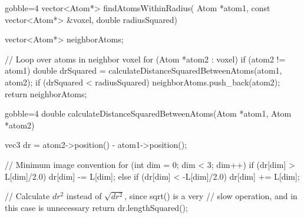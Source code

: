 \begin{listing}[!htb]%
\begin{cppcode*}{gobble=4}
    vector<Atom*> findAtomsWithinRadius(
        Atom *atom1, const vector<Atom*> &voxel, double radiusSquared)
    {
        vector<Atom*> neighborAtoms;
        
        // Loop over atoms in neighbor voxel
        for (Atom *atom2 : voxel)
        {
            if (atom2 != atom1)
            {
                double drSquared = 
                    calculateDistanceSquaredBetweenAtoms(atom1, atom2);
                if (drSquared < radiusSquared)
                {
                    neighborAtoms.push_back(atom2);
                }
            }
        }
        return neighborAtoms;
    }
\end{cppcode*}
\caption{Test%
    \texttt{findAtomsWithinRadius}. See \cref{list:calculateDistanceSquaredBetweenAtoms} for an example implementation of \texttt{calculateDistanceSquaredBetweenAtoms}.%
    \label{list:findAtomsWithinRadius}%
}%
\end{listing}%

\begin{listing}[!htb]%
\begin{cppcode*}{gobble=4}
    double calculateDistanceSquaredBetweenAtoms(Atom *atom1, Atom *atom2)
    {
        vec3 dr = atom2->position() - atom1->position();
        
        // Minimum image convention
        for (int dim = 0; dim < 3; dim++)
        {
            if      (dr[dim] >  L[dim]/2.0) dr[dim] -= L[dim];
            else if (dr[dim] < -L[dim]/2.0) dr[dim] += L[dim];
        }
        
        // Calculate $dr^2$ instead of $\sqrt{dr^2}$, since sqrt() is a very 
        // slow operation, and in this case is unnecessary
        return dr.lengthSquared();
    }
\end{cppcode*}
\caption{%
    \texttt{calculateDistanceSquaredBetweenAtoms}%
    \label{list:calculateDistanceSquaredBetweenAtoms}%
}%
\end{listing}%

\FloatBarrier
